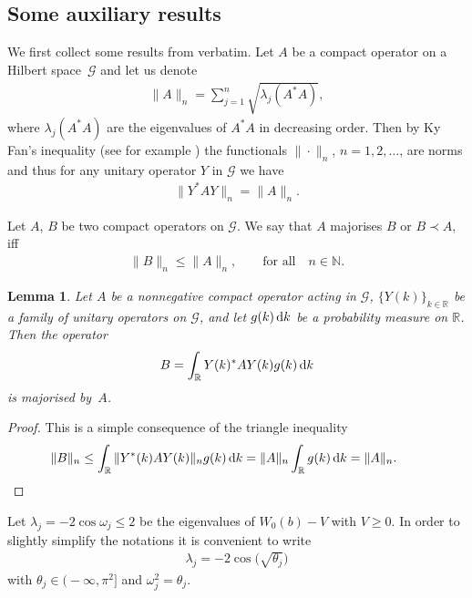 \documentclass[pdftex]{sigma}%
\numberwithin{equation}{section}
\newtheorem{Lemma}[Theorem]{Lemma}
\begin{document}
\subsection{Some auxiliary results}
We first collect some results from \cite{HLW} verbatim.
Let $A$ be a compact operator on a Hilbert space~$\mathcal{G}$ and let us denote
\begin{gather*}
\|A\|_n=\sum_{j=1}^n\sqrt{\lambda_j(A^*A)},
\end{gather*}
where $\lambda_j(A^*A)$ are the eigenvalues of $A^*A$ in decreasing order.
Then by Ky Fan's inequality (see for example \cite[Lemma~4.2]{GK}) the functionals $\|\cdot\|_n$, $n = 1,2,\dots $,
are norms and thus for any unitary operator $Y$ in $\mathcal{G}$ we have
\begin{gather*}
\|Y^* A Y\|_n = \|A\|_n.
\end{gather*}

\begin{Definition}
Let $A$, $B$ be two compact operators on $\mathcal{G}$. We say that $A$ majorises $B$ or $B\prec A$, iff
\begin{gather*}
\|B\|_n \le \|A\|_n, \qquad \text{for all} \quad n \in \mathbb N.
\end{gather*}
\end{Definition}

\begin{Lemma}\label{lem:maj}
Let $A$ be a nonnegative compact operator acting in $\mathcal{G}$, $\{Y(k)\}_{k\in \mathbb R}$ be a family of unitary operators on $\mathcal{G}$, and let $g(k)\, {\rm d} k$ be a probability measure on $\mathbb R$. Then the operator
\begin{gather*}
B = \int_{\mathbb R} Y(k)^* A Y(k) g(k) \, {\rm d} k
\end{gather*}
is majorised by~$A$.
\end{Lemma}

\begin{proof}This is a simple consequence of the triangle inequality
\begin{gather*}
\|B\|_n \le \int_{\mathbb R} \| Y^*(k) A Y(k)\|_n g(k) \, {\rm d} k = \|A\|_n \int_{\mathbb R} g(k) \, {\rm d} k = \|A\|_n.\tag*{\qed}
\end{gather*}
 \renewcommand{\qed}{}
\end{proof}

Let $\lambda_j=-2\cos\omega_j\le 2$ be the eigenvalues of $W_0(b)-V$ with $V\ge0$. In order to slightly simplify the notations it is convenient to write
\begin{gather*}
\lambda_j=-2\cos\big(\sqrt{\theta_j}\big)
\end{gather*}
with $\theta_j\in\big({-}\infty,\pi^2\big]$ and $\omega_j^2=\theta_j$.
\end{document}

